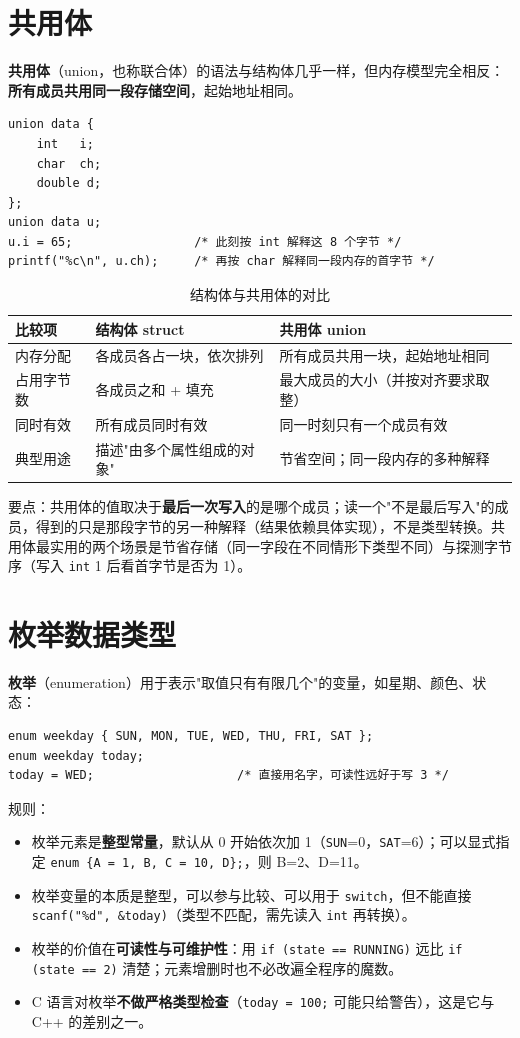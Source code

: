 \section{共用体}
\textbf{共用体}（union，也称联合体）的语法与结构体几乎一样，但内存模型完全相反：\textbf{所有成员共用同一段存储空间}，起始地址相同。
\begin{lstlisting}
union data {
    int   i;
    char  ch;
    double d;
};
union data u;
u.i = 65;                 /* 此刻按 int 解释这 8 个字节 */
printf("%c\n", u.ch);     /* 再按 char 解释同一段内存的首字节 */
\end{lstlisting}

\begin{table}[htbp]
\centering
\caption{结构体与共用体的对比}
\footnotesize
\begin{tabularx}{\textwidth}{@{}p{2.6cm}p{4.2cm}X@{}}
\toprule
比较项 & 结构体 struct & 共用体 union \\
\midrule
内存分配 & 各成员各占一块，依次排列 & 所有成员共用一块，起始地址相同 \\
占用字节数 & 各成员之和 + 填充 & 最大成员的大小（并按对齐要求取整） \\
同时有效 & 所有成员同时有效 & 同一时刻只有一个成员有效 \\
典型用途 & 描述"由多个属性组成的对象" & 节省空间；同一段内存的多种解释 \\
\bottomrule
\end{tabularx}
\end{table}

要点：共用体的值取决于\textbf{最后一次写入}的是哪个成员；读一个"不是最后写入"的成员，得到的只是那段字节的另一种解释（结果依赖具体实现），不是类型转换。共用体最实用的两个场景是节省存储（同一字段在不同情形下类型不同）与探测字节序（写入 \texttt{int} 1 后看首字节是否为 1）。

\section{枚举数据类型}
\textbf{枚举}（enumeration）用于表示"取值只有有限几个"的变量，如星期、颜色、状态：
\begin{lstlisting}
enum weekday { SUN, MON, TUE, WED, THU, FRI, SAT };
enum weekday today;
today = WED;                    /* 直接用名字，可读性远好于写 3 */
\end{lstlisting}
规则：
\begin{itemize}
  \item 枚举元素是\textbf{整型常量}，默认从 0 开始依次加 1（\texttt{SUN}=0，\texttt{SAT}=6）；可以显式指定 \texttt{enum \{A = 1, B, C = 10, D\};}，则 B=2、D=11。
  \item 枚举变量的本质是整型，可以参与比较、可以用于 \texttt{switch}，但不能直接 \texttt{scanf("\%d", \&today)}（类型不匹配，需先读入 \texttt{int} 再转换）。
  \item 枚举的价值在\textbf{可读性与可维护性}：用 \texttt{if (state == RUNNING)} 远比 \texttt{if (state == 2)} 清楚；元素增删时也不必改遍全程序的魔数。
  \item C 语言对枚举\textbf{不做严格类型检查}（\texttt{today = 100;} 可能只给警告），这是它与 C++ 的差别之一。
\end{itemize}

